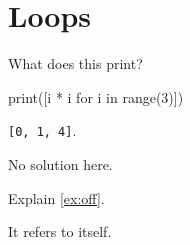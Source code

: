 \documentclass{akizumi-note}
\begin{document}
\section{Loops}
\begin{exercises}[title=Drills]
\item What does this print?
\begin{codeblock}[lang=Python]
print([i * i for i in range(3)])
\end{codeblock}
\begin{solution}
\verb|[0, 1, 4]|.
\end{solution}
\item No solution here.
\end{exercises}
\begin{exercise}\label{ex:off}
Explain \cref{ex:off}.
\end{exercise}
\begin{solution}
It refers to itself.
\end{solution}
\printsolutions
\end{document}
